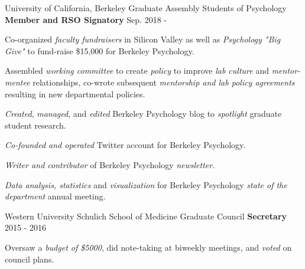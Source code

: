

\begin{cventries}

  \cventry 
    {University of California, Berkeley} %
    {Graduate Assembly Students of Psychology}
    {\textbf{Member and RSO Signatory}} %
    {Sep. 2018 - } %
    {
      \begin{cvitems} %
        \item {Co-organized \textit{faculty fundraisers} in Silicon Valley as well as \textit{Psychology "Big Give"} to fund-raise \$15,000 for Berkeley Psychology.}
        \item {Assembled \textit{working committee} to create \textit{policy} to improve \textit{lab culture} and \textit{mentor-mentee} relationships, co-wrote subsequent \textit{mentorship and lab policy agreements} resulting in new departmental policies.}
        \item {\textit{Created}, \textit{managed}, and \textit{edited} Berkeley Psychology blog to \textit{spotlight} graduate student research.}
        \item {\textit{Co-founded and operated} Twitter account for Berkeley Psychology.}
        \item {\textit{Writer and contributor} of Berkeley Psychology \textit{newsletter}.}
        \item {\textit{Data analysis, statistics} and \textit{visualization} for Berkeley Psychology \textit{state of the department} annual meeting.}
      \end{cvitems}
    }
    
  \cventry
  	{Western University} %
  	{Schulich School of Medicine Graduate Council} %
    {\textbf{Secretary}} %
    {2015 - 2016} %
    {
      \begin{cvitems} %
        \item {Oversaw a \textit{budget of \$5000}, did note-taking at biweekly meetings, and \textit{voted} on council plans.}
      \end{cvitems}
    }
    

\end{cventries}
